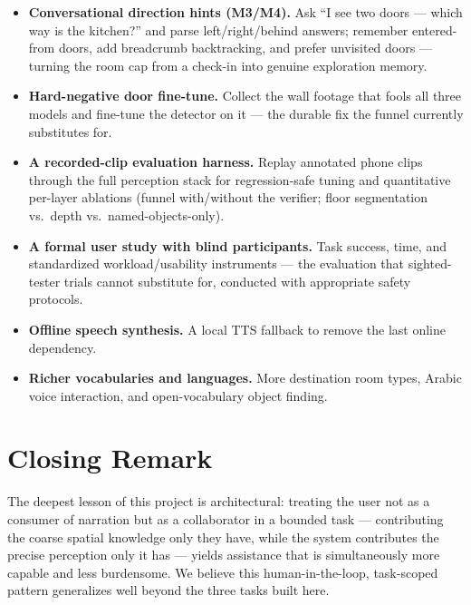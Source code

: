 \begin{itemize}[nosep]
  \item \textbf{Conversational direction hints (M3/M4).} Ask ``I see two doors ---
        which way is the kitchen?'' and parse left/right/behind answers; remember
        entered-from doors, add breadcrumb backtracking, and prefer unvisited doors
        --- turning the room cap from a check-in into genuine exploration memory.
  \item \textbf{Hard-negative door fine-tune.} Collect the wall footage that fools
        all three models and fine-tune the detector on it --- the durable fix the
        funnel currently substitutes for.
  \item \textbf{A recorded-clip evaluation harness.} Replay annotated phone clips
        through the full perception stack for regression-safe tuning and
        quantitative per-layer ablations (funnel with/without the verifier;
        floor segmentation vs.\ depth vs.\ named-objects-only).
  \item \textbf{A formal user study with blind participants.} Task success, time,
        and standardized workload/usability instruments --- the evaluation that
        sighted-tester trials cannot substitute for, conducted with appropriate
        safety protocols.
  \item \textbf{Offline speech synthesis.} A local TTS fallback to remove the last
        online dependency.
  \item \textbf{Richer vocabularies and languages.} More destination room
        types, Arabic voice interaction, and open-vocabulary object finding.
\end{itemize}

\section{Closing Remark}

The deepest lesson of this project is architectural: treating the user not as a
consumer of narration but as a collaborator in a bounded task --- contributing the
coarse spatial knowledge only they have, while the system contributes the precise
perception only it has --- yields assistance that is simultaneously more capable and
less burdensome. We believe this human-in-the-loop, task-scoped pattern generalizes
well beyond the three tasks built here.
